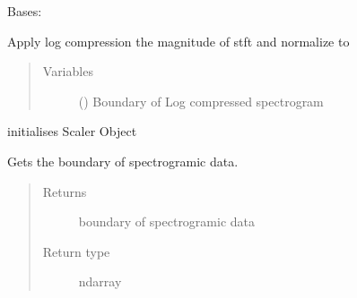 \documentclass[letterpaper,10pt,english,openany,oneside]{sphinxmanual}
\begin{document}
\begin{fulllineitems}
\label{\detokenize{docs/source/preprocess:preprocess.preprocess_tools.Scaler}}
Bases: 

Apply log compression the magnitude of stft and normalize to 
\begin{quote}\begin{description}
\item[{Variables}] \leavevmode
{} () \textendash{} Boundary of Log compressed spectrogram

\end{description}\end{quote}

\begin{fulllineitems}
\label{\detokenize{docs/source/preprocess:preprocess.preprocess_tools.Scaler.___init___}}
initialises Scaler Object

\end{fulllineitems}


\begin{fulllineitems}
\label{\detokenize{docs/source/preprocess:preprocess.preprocess_tools.Scaler.boundary}}
Gets the boundary of spectrogramic data.
\begin{quote}\begin{description}
\item[{Returns}] \leavevmode
boundary of spectrogramic data

\item[{Return type}] \leavevmode
ndarray

\end{description}\end{quote}

\end{fulllineitems}


\end{fulllineitems}
\end{document}
